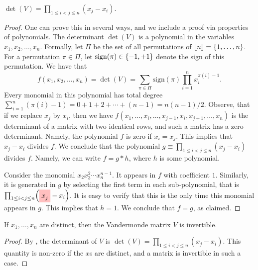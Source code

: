 \begin{claim}
    $\det(V)=\prod_{1\le i<j\le n} (x_j-x_i)$.
\end{claim}
\begin{proof}
    One can prove this in several ways, and we include a proof via
    properties of polynomials.  The determinant $\det(V)$ is a
    polynomial in the variables $x_1, x_2, \ldots, x_n$. Formally, let
    $\Pi$ be the set of all permutations of
    $\left\llbracket n \right\rrbracket = \left\{ {1,\ldots, n} \right\}$. For a permutation $\pi \in \Pi$,
    let $\mathrm{sign}(\pi) \in \left\{ {-1,+1} \right\}$ denote the sign of this
    permutation. We have that
    \begin{equation*}
        f(x_1, x_2, \ldots, x_n)%
        =%
        \det(V)%
        =%
        \sum_{\pi \in \Pi} \mathrm{sign}(\pi) \prod_{i=1}^n x_i^{\pi(i)-1}.
    \end{equation*}
    Every monomial in this polynomial has total degree
    $\sum_{i=1}^n (\pi(i)-1) = 0 + 1 + 2 +\cdots+ (n-1) = n(n-1)/2$.
    Observe, that if we replace $x_j$ by $x_i$, then we have
    \begin{math}
        f(x_1, \ldots, x_i,\ldots, x_{j-1}, x_i, x_{j+1}, \ldots,
        x_n)%
    \end{math}
    is the determinant of a matrix with two identical rows, and such a
    matrix has a zero determinant. Namely, the polynomial $f$ is zero
    if $x_i=x_j$. This implies that $x_j-x_i$ divides $f$. We conclude
    that the polynomial $g \equiv \prod_{1\le i<j\le n} (x_j-x_i)$
    divides $f$. Namely, we can write $f = g * h$, where $h$ is some
    polynomial.

    Consider the monomial $x_2 x_3^2 \cdots x_n^{n-1}$. It appears in
    $f$ with coefficient $1$. Similarly, it is generated in $g$ by
    selecting the first term in each sub-polynomial, that is
    \begin{math}
        \prod_{1\le i<j\le n} \Bigl( \highlight{x_j^{}\bigr.} -
        x_i\Bigr).
    \end{math}
    It is easy to verify that this is the only time this monomial appears
    in $g$. This implies that $h =1$. We conclude that $f=g$, as
    claimed.
\end{proof}

\begin{claim}
    If $x_1, \ldots, x_n$ are distinct, then the Vandermonde matrix $V$ is
    invertible. 
\end{claim}
\begin{proof}
    By , the determinant of $V$ is
    $\det(V)=\prod_{1\le i<j\le n} (x_j-x_i)$. This quantity is
    non-zero if the $x$s are distinct, and a matrix is invertible in
    such a case.
\end{proof}

